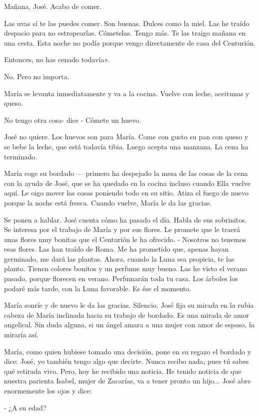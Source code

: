 \documentclass[12pt, twoside, openright]{book} %
\begin{document}
Mañana, José. Acabo de comer. 

Las uvas sí te las puedes comer. Son buenas. Dulces como la miel. Las he traído despacio para no estropearlas. Cómetelas. Tengo más. Te las traigo mañana en una cesta. Esta noche no podía porque vengo directamente de casa del Centurión. 

Entonces, no has cenado todavía». 

No. Pero no importa. 

María se levanta inmediatamente y va a la cocina. Vuelve con leche, aceitunas y queso. 

No tengo otra cosa- dice - Cómete un huevo. 

José no quiere. Los huevos son para María. Come con gusto su pan con queso y se bebe la leche, que está todavía tibia. Luego acepta una manzana. La cena ha terminado. 

María coge su bordado — primero ha despejado la mesa de las cosas de la cena con la ayuda de José, que se ha quedado en la cocina incluso cuando Ella vuelve aquí. Le oigo mover las cosas poniendo todo en su sitio. Atiza el fuego de nuevo porque la noche está fresca. Cuando vuelve, María le da las gracias. 

Se ponen a hablar. José cuenta cómo ha pasado el día. Habla de sus sobrinitos. Se interesa por el trabajo de María y por sus flores. Le promete que le traerá unas flores muy bonitas que el Centurión le ha ofrecido. - Nosotros no tenemos esas flores. Las han traído de Roma. Me ha prometido que, apenas hayan germinado, me dará las plantas. Ahora, cuando la Luna sea propicia, te las planto. Tienen colores bonitos y un perfume muy bueno. Las he visto el verano pasado, porque florecen en verano. Perfumarán toda tu casa. Los árboles los podaré más tarde, con la Luna favorable. Es ése el momento. 

María sonríe y de nuevo le da las gracias. Silencio. José fija su mirada en la rubia cabeza de María inclinada hacia su trabajo de bordado. Es una mirada de amor angelical. Sin duda alguna, si un ángel amara a una mujer con amor de esposo, la miraría así. 

María, como quien hubiese tomado una decisión, pone en su regazo el bordado y dice: José, yo también tengo algo que decirte. Nunca recibo nada, pues tú sabes qué retirada vivo. Pero, hoy he recibido una noticia. He tenido noticia de que nuestra parienta Isabel, mujer de Zacarías, va a tener pronto un hijo... José abre enormemente los ojos y dice: 

- ¿A su edad? 
\end{document}
